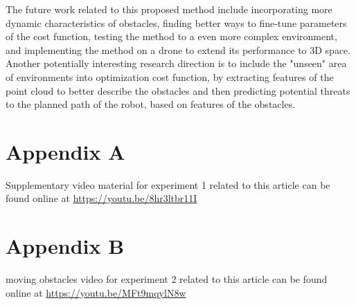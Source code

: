 \documentclass{iosart2c}
\begin{document}
The future work related to this proposed method include incorporating more dynamic characteristics of obstacles, finding better ways to fine-tune parameters of the cost function, testing the method to a even more complex environment, and implementing the method on a drone to extend its performance to 3D space. Another potentially interesting research direction is to include the "unseen" area of environments into optimization cost function, by extracting features of the point cloud to better describe the obstacles and then predicting potential threats to the planned path of the robot, based on features of the obstacles.


\section{Appendix A}\label{Appendix A}
Supplementary video material for experiment 1 related to this article can be found online at \url{https://youtu.be/8hr3ltbr11I}

\section{Appendix B}\label{Appendix B}
moving obstacles video for experiment 2 related to this article can be found online at \url{https://youtu.be/MFt9mqylN8w} 
\end{document}
